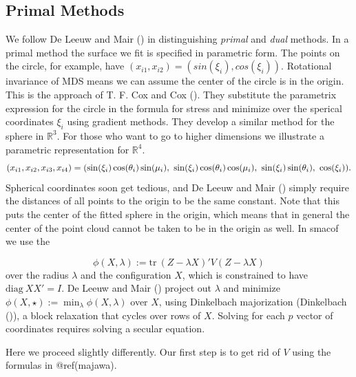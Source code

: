 \documentclass[
  12pt,
  letterpaper,
  DIV=11,
  numbers=noendperiod]{scrreprt}
\theoremstyle{remark}
\begin{document}
\subsection{Primal Methods}\label{circprimal}

We follow De Leeuw and Mair () in
distinguishing \emph{primal} and \emph{dual} methods. In a primal method
the surface we fit is specified in parametric form. The points on the
circle, for example, have \((x_{i1},x_{i2})=(sin(\xi_i),cos(\xi_i))\).
Rotational invariance of MDS means we can assume the center of the
circle is in the origin. This is the approach of T. F. Cox and Cox
(). They substitute the parametrix
expression for the circle in the formula for stress and minimize over
the sperical coordinates \(\xi_i\) using gradient methods. They develop
a similar method for the sphere in \(\mathbb{R}^3\). For those who want
to go to higher dimensions we illustrate a parametric representation for
\(\mathbb{R}^4\). \[
(x_{i1},x_{i2},x_{i3},x_{i4})=\\(\sin(\xi_i)\cos(\theta_i)\sin(\mu_i),\
\sin(\xi_i)\cos(\theta_i)\cos(\mu_i),\ \sin(\xi_i)\sin(\theta_i),\ \cos(\xi_i)).
\] Spherical coordinates soon get tedious, and De Leeuw and Mair
(\citeproc{ref-deleeuw_mair_A_09c}{2009}) simply require the distances
of all points to the origin to be the same constant. Note that this puts
the center of the fitted sphere in the origin, which means that in
general the center of the point cloud cannot be taken to be in the
origin as well. In smacof we use the

\[
\phi(X,\lambda):=\text{tr}\ (Z-\lambda X)'V(Z-\lambda X)
\] over the radius \(\lambda\) and the configuration \(X\), which is
constrained to have \(\text{diag}\ XX'=I\). De Leeuw and Mair
() project out \(\lambda\) and
minimize \(\phi(X,\star):=\min_\lambda\phi(X,\lambda)\) over \(X\),
using Dinkelbach majorization (Dinkelbach
()), a block relaxation that cycles
over rows of \(X\). Solving for each \(p\) vector of coordinates
requires solving a secular equation.

Here we proceed slightly differently. Our first step is to get rid of
\(V\) using the formulas in @ref(majawa).
\end{document}
